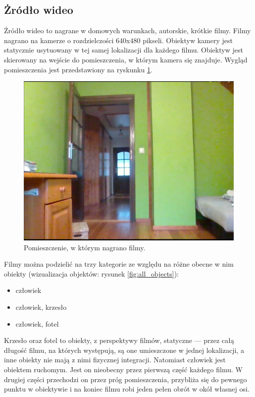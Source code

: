 \subsection{Żródło wideo}
\label{sec:zrodlo_wideo}
Źródło wideo to nagrane w domowych warunkach, autorskie, krótkie filmy. Filmy nagrano na kamerze o rozdzielczości 640x480 pikseli. Obiektyw kamery jest statycznie usytuowany w tej samej lokalizacji dla każdego filmu. Obiektyw jest skierowany na wejście do pomieszczenia, w którym kamera się znajduje. Wygląd pomieszczenia jest przedstawiony na ryskunku \ref{fig:test-dokladnosc-scena}.

\begin{figure}[H]
    \centering
    \includegraphics[width=\linewidth]{r_test_dokładności/vid_pics/1_1.jpg}
    \caption{Pomieszczenie, w którym nagrano filmy.}
    \label{fig:test-dokladnosc-scena}
\end{figure}


Filmy można podzielić na trzy kategorie ze względu na różne obecne w nim obiekty (wizualizacja objektów: rysunek \ref{fig:all_objects}):
\begin{itemize}
    \item człowiek
    \item człowiek, krzesło
    \item człowiek, fotel
\end{itemize}
Krzesło oraz fotel to obiekty, z perspektywy filmów, statyczne --- przez całą długość filmu, na których występują, są one umieszczone w jednej lokalizacji, a inne obiekty nie mają z nimi fizycznej integracji.
Natomiast człowiek jest obiektem ruchomym. Jest on nieobecny przez pierwszą część każdego filmu. W drugiej części przechodzi on przez próg pomieszczenia, przybliża się do pewnego punktu w obiektywie i na koniec filmu robi jeden pełen obrót w okół własnej osi. 

